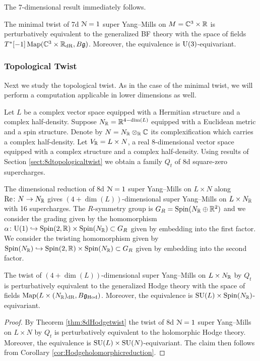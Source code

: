 \documentclass[10pt, oneside]{article}
\begin{document}
The 7-dimensional result immediately follows.

\begin{theorem}
The minimal twist of 7d $\mathcal N=1$ super Yang--Mills on $M=\mathbb C^3\times \mathbb R$ is perturbatively equivalent to the generalized BF theory with the space of fields $T^*[-1]\operatorname{Map}(\mathbb C^3\times \mathbb R_{\mathrm{dR}}, B\mathfrak g)$. Moreover, the equivalence is $\mathrm{U}(3)$-equivariant.
\label{thm:7dminimaltwist}
\end{theorem}

\subsubsection{Topological Twist}
\label{sect:7dtopologicaltwist}

Next we study the topological twist. As in the case of the minimal twist, we will perform a computation applicable in lower dimensions as well.

Let $L$ be a complex vector space equipped with a Hermitian structure and a complex half-density. Suppose $N_\mathbb R = \mathbb R^{4-\dim(L)}$ equipped with a Euclidean metric and a spin structure. Denote by $N=N_\mathbb R\otimes_\mathbb R\mathbb C$ its complexification which carries a complex half-density. Let $V_\mathbb R=L\times N$, a real 8-dimensional vector space equipped with a complex structure and a complex half-density. Using results of Section \ref{sect:8dtopologicaltwist} we obtain a family $Q_t$ of 8d square-zero supercharges.

The dimensional reduction of 8d $\mathcal N=1$ super Yang--Mills on $L\times N$ along $\mathrm{Re}\colon N\rightarrow N_\mathbb R$ gives $(4+\dim(L))$-dimensional super Yang--Mills on $L\times N_\mathbb R$ with 16 supercharges. The $R$-symmetry group is $G_R=\mathrm{Spin}(N_\mathbb R\oplus \mathbb R^2)$ and we consider the grading given by the homomorphism $\alpha\colon\mathrm{U}(1)\hookrightarrow \mathrm{Spin}(2, \mathbb R)\times \mathrm{Spin}(N_\mathbb R)\subset G_R$ given by embedding into the first factor. We consider the twisting homomorphism given by $\mathrm{Spin}(N_\mathbb R)\hookrightarrow \mathrm{Spin}(2, \mathbb R)\times \mathrm{Spin}(N_\mathbb R)\subset G_R$ given by embedding into the second factor.

\begin{theorem}
The twist of $(4+\dim(L))$-dimensional super Yang--Mills on $L\times N_\mathbb R$ by $Q_t$ is perturbatively equivalent to the generalized Hodge theory with the space of fields $\operatorname{Map}(L\times (N_\mathbb R)_{\mathrm{dR}}, B\mathfrak g_{\mathrm{Hod}})$. Moreover, the equivalence is $\mathrm{SU}(L)\times \mathrm{Spin}(N_\mathbb R)$-equivariant.
\label{thm:8dHodgereduction}
\end{theorem}
\begin{proof}
By Theorem \ref{thm:8dHodgetwist} the twist of 8d $\mathcal N=1$ super Yang--Mills on $L\times N$ by $Q_t$ is perturbatively equivalent to the holomorphic Hodge theory. Moreover, the equivalence is $\mathrm{SU}(L)\times \mathrm{SU}(N)$-equivariant. The claim then follows from Corollary \ref{cor:Hodgeholomorphicreduction}.
\end{proof}
\end{document}
